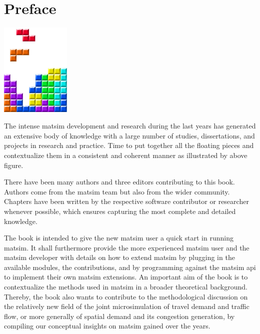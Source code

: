 \chapter*{Preface}

\begin{center} \includegraphics[width=0.25\textwidth, angle=0]{frontmatter/figures/MATSimBook} \end{center}

The intense \gls{matsim} development and research during the last years has generated an extensive body of knowledge with a large number of studies, dissertations, and projects in research and practice. Time to put together all the floating pieces and contextualize them in a consistent and coherent manner as illustrated by above figure. 

There have been many authors and three editors contributing to this book. Authors come from the \gls{matsim} team but also from the wider community. Chapters have been written by the respective software contributor or researcher whenever possible, which ensures capturing the most complete and detailed knowledge.

The book is intended to give the new \gls{matsim} user a quick start in running \gls{matsim}. It shall furthermore provide the more experienced \gls{matsim} user and the \gls{matsim} developer with details on how to extend \gls{matsim} by plugging in the available modules, \ie the \glspl{contribution}, and by programming against the \gls{matsim} \gls{api} to implement their own \gls{matsim} \glspl{extension}. An important aim of the book is to contextualize the methods used in \gls{matsim} in a broader theoretical background. Thereby, the book also wants to contribute to the methodological discussion on the relatively new field of the joint \gls{microsimulation} of travel demand and traffic flow, or more generally of spatial demand and its congestion generation, by compiling our conceptual insights on \gls{matsim} gained over the years.

